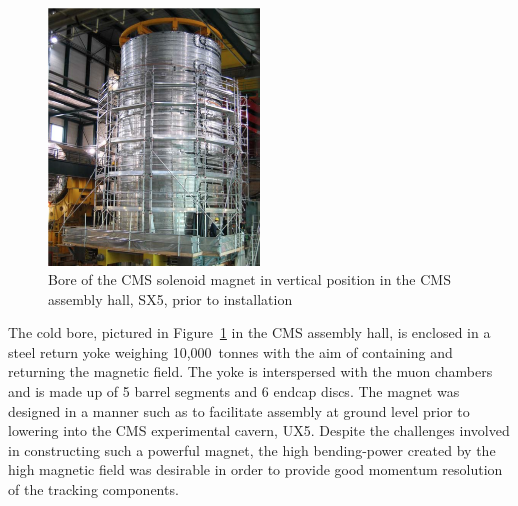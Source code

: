 \begin{figure}[hbtp]
   \centering
     \includegraphics[width=0.5\textwidth]{Chapters/02_Detector/Images/Cold_mass.png}\hfill
     \caption[Bore of the CMS solenoid magnet in vertical position in the CMS assembly hall, SX5.]{Bore of the
     CMS solenoid magnet in vertical position in the CMS assembly hall, SX5, prior to installation \cite{CMS_experiment}}
     \label{fig:CMS_magnet_cold_bore}
\end{figure}
 
The cold bore, pictured in Figure~\ref{fig:CMS_magnet_cold_bore} in the CMS assembly hall, is enclosed in a
steel return yoke weighing 10,000~tonnes with the aim of containing and returning the magnetic field. The yoke
is interspersed with the muon chambers and is made up of 5 barrel segments and 6 endcap discs. The magnet was
designed in a manner such as to facilitate assembly at ground level prior to lowering into the CMS
experimental cavern, UX5. Despite the challenges involved in constructing such a powerful magnet, the high
bending-power created by the high magnetic field was desirable in order to provide good momentum
resolution of the tracking components.

